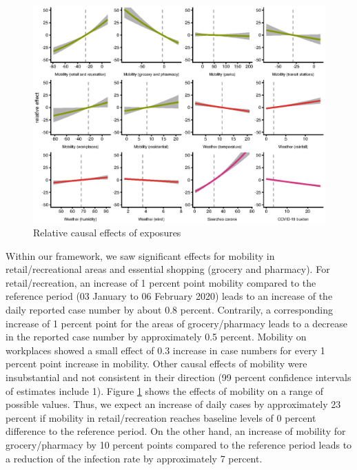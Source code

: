 \documentclass[]{elsarticle} %
\makeatletter
\def\maxwidth{\ifdim\Gin@nat@width>\linewidth\linewidth
\else\Gin@nat@width\fi}
\let\Oldincludegraphics\includegraphics
\renewcommand{\includegraphics}[1]{\Oldincludegraphics[width=\maxwidth]{#1}}
\makeatother
\begin{document}
\begin{figure}
\centering
\includegraphics{figures/f_exposure_vs_effect.eps}
\caption{\label{fig:effectsrange}Relative causal effects of exposures}
\end{figure}

Within our framework, we saw significant effects for mobility in
retail/recreational areas and essential shopping (grocery and pharmacy).
For retail/recreation, an increase of 1 percent point mobility compared
to the reference period (03 January to 06 February 2020) leads to an
increase of the daily reported case number by about 0.8 percent.
Contrarily, a corresponding increase of 1 percent point for the areas of
grocery/pharmacy leads to a decrease in the reported case number by
approximately 0.5 percent. Mobility on workplaces showed a small effect
of 0.3 increase in case numbers for every 1 percent point increase in
mobility. Other causal effects of mobility were insubstantial and not
consistent in their direction (99 percent confidence intervals of
estimates include 1). Figure \ref{fig:effectsrange} shows the effects of
mobility on a range of possible values. Thus, we expect an increase of
daily cases by approximately 23 percent if mobility in retail/recreation
reaches baseline levels of 0 percent difference to the reference period.
On the other hand, an increase of mobility for grocery/pharmacy by 10
percent points compared to the reference period leads to a reduction of
the infection rate by approximately 7 percent.
\end{document}
